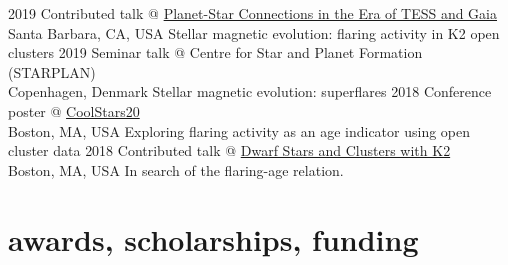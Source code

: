 \documentclass[]{k-cv} %
\begin{document}
\begin{entrylist}
\entry
{2019}
{Contributed talk @ \href{https://www.kitp.ucsb.edu/activities/exostar-c19}{Planet-Star Connections in the Era of TESS and Gaia}}
{\\Santa Barbara, CA, USA}
{Stellar magnetic evolution: flaring activity in K2 open clusters}
\entry
{2019}
{Seminar talk @ Centre for Star and Planet Formation (STARPLAN)}
{\\ Copenhagen, Denmark}
{Stellar magnetic evolution: superflares}
\entry
{2018}
{Conference poster @ \href{http://coolstars20.cfa.harvard.edu/}{CoolStars20}}
{\\ Boston, MA, USA}
{Exploring flaring activity as an age indicator using open cluster data}
\entry
{2018}
{Contributed talk @ \href{https://keplergo.github.io/KeplerScienceWebsite/workshop-on-dwarf-stars-and-clusters-with-k2-registration-now-open-space-is-limited.html}{Dwarf Stars and Clusters with K2}}
{\\Boston, MA, USA}
{In search of the flaring-age relation.}
\end{entrylist}


%

\newpage

\section{awards, scholarships, funding}
\end{document}
